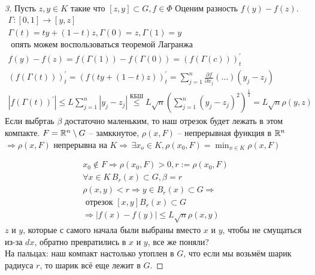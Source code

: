 \documentclass[document]{subfiles}
\begin{document}
\begin{proof}[3]
    Пусть $z, y \in K$ такие что $[z,y] \subset G, f \in \Phi$ 
Оценим разность $f(y) - f(z)$. 
    \begin{gather*}
        \Gamma: [0,1] \rightarrow [y,z] \\
        \Gamma(t) = ty + (1-t)z, \Gamma(0) = z, \Gamma(1) = y \\
        \text{ опять можем воспользоваться теоремой Лагранжа } \\
        f(y) - f(z) = f(\Gamma(1)) - f(\Gamma(0)) = (f(\Gamma(c)))^\prime_t \\
        (f(\Gamma(t)))^\prime_t = (f(ty + (1-t)z))^\prime_t = \sum^n_{j=1} \frac{\partial f}{\partial x_j} (\ldots) (y_j - z_j) \\
        |f(\Gamma(t))^\prime| \leq L \sum^n_{j=1} |y_j - z_j| \stackrel{\text{КБШ}}{\leq} L\sqrt{n} \left( \sum^n_{j=1} (y_j - z_j)^2 \right)^\frac{1}{2} = L \sqrt{n} \rho(y,z)
    \end{gather*}
    Если выбртаь $\beta$ достаточно маленьким, то наш отрезок будет лежать в этом компакте. $F = \mathbb{R}^n \setminus G$ -- замккнутое, $\rho(x,F)$ -- непрерывная функция  в 
    $\mathbb{R}^n$ $\Rightarrow \rho(x,F)$ непрерывна на $K \Rightarrow \, \exists x_o \in K, \rho(x_0,F) = \min_{x \in K} \rho(x,F)$

    \begin{gather*}
        x_0 \notin F \Rightarrow \rho(x_0, F) > 0, r := \rho(x_0, F) \\
        \forall x \in K \, B_r(x) \subset G, \beta = r \\
        \rho(x,y) < r \Rightarrow y \in B_r(x) \subset G \Rightarrow \\
        \text{ отрезок } [x,y] B_r(x) \subset G \\
        \Rightarrow |f(x) - f(y)| \leq L \sqrt{n} \rho(x,y)
    \end{gather*}
    $z$ и $y$, которые с самого начала были выбраны вместо $x$ и $y$, чтобы не смущаться из-за $dx$, обратно превратились в $x$ и $y$, все же поняли? \\
    На пальцах: наш компакт настолько утоплен в $G$, что если мы возьмём шарик радиуса $r$, то шарик всё еще лежит в $G$.
\end{proof}
\end{document}
